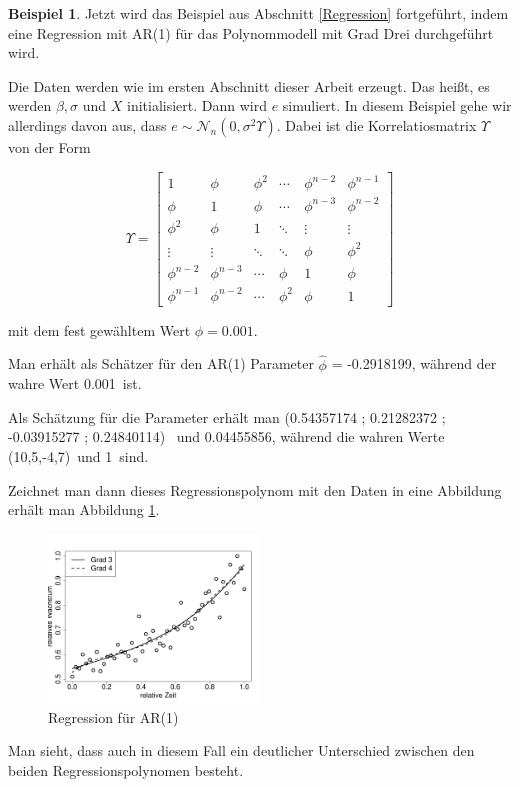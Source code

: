 \documentclass[12pt,a4paper]{article}
\theoremstyle{definition}
\newtheorem{Beispiel}[Definition]{Beispiel}
\theoremstyle{definition}
\theoremstyle{definition}
\theoremstyle{definition}
\newcommand{\betatrue}{(10,5,-4,7)}
\newcommand{\phitrue}{0.001}
\newcommand{\sigmatrue}{1}
\newcommand{\betaARone}{ (0.54357174 ; 0.21282372 ; -0.03915277 ; 0.24840114) }
\newcommand{\sigmaARone}{0.04455856}
\newcommand{\phiestone}{-0.2918199}
\begin{document}
\begin{Beispiel}
Jetzt wird das Beispiel aus Abschnitt \ref{Regression} fortgeführt, indem eine Regression mit AR(1) für das Polynommodell mit Grad Drei durchgeführt wird. 

Die Daten werden wie im ersten Abschnitt dieser Arbeit erzeugt. Das heißt, es werden $\beta, \sigma$ und $X$ initialisiert. Dann wird $e$ simuliert. In diesem Beispiel gehe wir allerdings davon aus, dass $e \sim \mathscr{N}_n(0, \sigma^2 \Upsilon)$. Dabei ist die Korrelatiosmatrix $\Upsilon$ von der Form 

\[
\Upsilon = 
\left[
   \begin{array}{cccccc}
     1 				& \phi 			& \phi^2	& \cdots	& \phi^{n-2}	& \phi^{n-1} 	\\
     \phi 			& 1		 		& \phi 		& \cdots	& \phi^{n-3}	& \phi^{n-2} 	\\
     \phi^2 		& \phi 			& 1		 	& \ddots	& \vdots		& \vdots 		\\
     \vdots		 	& \vdots	 	& \ddots	& \ddots	& \phi			& \phi^{2} 	\\
     \phi^{n-2} 	& \phi^{n-3}	& \cdots 	& \phi		& 1				& \phi 		\\
     \phi^{n-1} 	& \phi^{n-2} 	& \cdots	& \phi^{2}	& \phi			& 1  
   \end{array}
\right]
\]

mit dem fest gewähltem Wert $\phi = \phitrue$.

Man erhält als Schätzer für den AR(1) Parameter $\hat{\phi}$ = \phiestone , während der wahre Wert \phitrue ~ist.

Als Schätzung für die Parameter erhält man \betaARone ~und \sigmaARone , während die wahren Werte \betatrue ~und \sigmatrue ~sind. 

Zeichnet man dann dieses Regressionspolynom mit den Daten in eine Abbildung erhält man Abbildung \ref{BSP-Reg-AR}.

\begin{figure}[H] 
  \centering
     \includegraphics[width=0.5\textwidth]{Bsp-Reg-AR}
  \caption{Regression für AR(1)}
  \label{BSP-Reg-AR}
\end{figure}

Man sieht, dass auch in diesem Fall ein deutlicher Unterschied zwischen den beiden Regressionspolynomen besteht.

\end{Beispiel}
\end{document}
